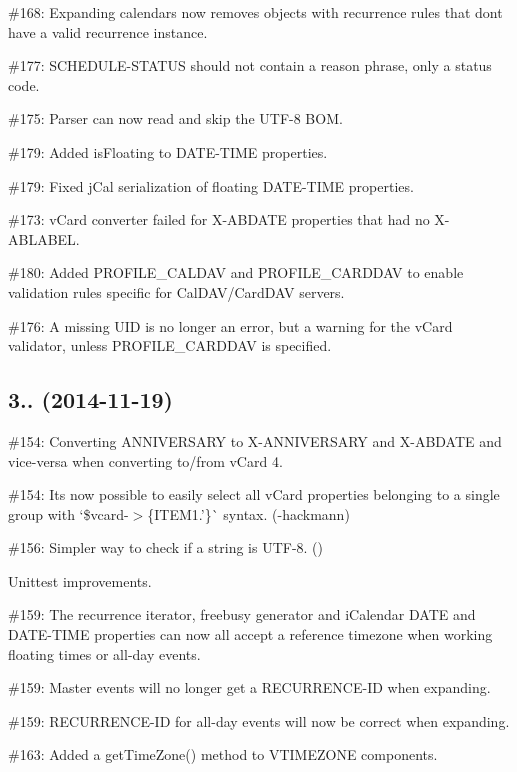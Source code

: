\begin{DoxyItemize}
\item \#168\+: Expanding calendars now removes objects with recurrence rules that don\textquotesingle{}t have a valid recurrence instance.
\item \#177\+: S\+C\+H\+E\+D\+U\+L\+E-\/\+S\+T\+A\+T\+US should not contain a reason phrase, only a status code.
\item \#175\+: Parser can now read and skip the U\+T\+F-\/8 B\+OM.
\item \#179\+: Added {\ttfamily is\+Floating} to {\ttfamily D\+A\+T\+E-\/\+T\+I\+ME} properties.
\item \#179\+: Fixed j\+Cal serialization of floating {\ttfamily D\+A\+T\+E-\/\+T\+I\+ME} properties.
\item \#173\+: v\+Card converter failed for {\ttfamily X-\/\+A\+B\+D\+A\+TE} properties that had no {\ttfamily X-\/\+A\+B\+L\+A\+B\+EL}.
\item \#180\+: Added {\ttfamily P\+R\+O\+F\+I\+L\+E\+\_\+\+C\+A\+L\+D\+AV} and {\ttfamily P\+R\+O\+F\+I\+L\+E\+\_\+\+C\+A\+R\+D\+D\+AV} to enable validation rules specific for Cal\+D\+A\+V/\+Card\+D\+AV servers.
\item \#176\+: A missing {\ttfamily U\+ID} is no longer an error, but a warning for the v\+Card validator, unless {\ttfamily P\+R\+O\+F\+I\+L\+E\+\_\+\+C\+A\+R\+D\+D\+AV} is specified.
\end{DoxyItemize}

\subsection*{3.. (2014-\/11-\/19) }


\begin{DoxyItemize}
\item \#154\+: Converting {\ttfamily A\+N\+N\+I\+V\+E\+R\+S\+A\+RY} to {\ttfamily X-\/\+A\+N\+N\+I\+V\+E\+R\+S\+A\+RY} and {\ttfamily X-\/\+A\+B\+D\+A\+TE} and vice-\/versa when converting to/from v\+Card 4.
\item \#154\+: It\textquotesingle{}s now possible to easily select all v\+Card properties belonging to a single group with `\$vcard-\/$>$\{\textquotesingle{}I\+T\+E\+M1.'\}\`{} syntax. (-\/hackmann)
\item \#156\+: Simpler way to check if a string is U\+T\+F-\/8. ()
\item Unittest improvements.
\item \#159\+: The recurrence iterator, freebusy generator and i\+Calendar D\+A\+TE and D\+A\+T\+E-\/\+T\+I\+ME properties can now all accept a reference timezone when working floating times or all-\/day events.
\item \#159\+: Master events will no longer get a {\ttfamily R\+E\+C\+U\+R\+R\+E\+N\+C\+E-\/\+ID} when expanding.
\item \#159\+: {\ttfamily R\+E\+C\+U\+R\+R\+E\+N\+C\+E-\/\+ID} for all-\/day events will now be correct when expanding.
\item \#163\+: Added a {\ttfamily get\+Time\+Zone()} method to {\ttfamily V\+T\+I\+M\+E\+Z\+O\+NE} components.
\end{DoxyItemize}

